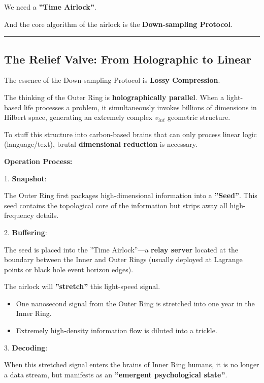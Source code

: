 We need a \textbf{''Time Airlock''}.

And the core algorithm of the airlock is the \textbf{Down-sampling Protocol}.

\hrule

\subsection{The Relief Valve: From Holographic to Linear}

The essence of the Down-sampling Protocol is \textbf{Lossy Compression}.

The thinking of the Outer Ring is \textbf{holographically parallel}. When a light-based life processes a problem, it simultaneously invokes billions of dimensions in Hilbert space, generating an extremely complex $v_{int}$ geometric structure.

To stuff this structure into carbon-based brains that can only process linear logic (language/text), brutal \textbf{dimensional reduction} is necessary.

\textbf{Operation Process:}

1.  \textbf{Snapshot}:

    The Outer Ring first packages high-dimensional information into a \textbf{''Seed''}. This seed contains the topological core of the information but strips away all high-frequency details.

2.  \textbf{Buffering}:

    The seed is placed into the ''Time Airlock''---a \textbf{relay server} located at the boundary between the Inner and Outer Rings (usually deployed at Lagrange points or black hole event horizon edges).

    The airlock will \textbf{''stretch''} this light-speed signal.

    \begin{itemize}
    \item One nanosecond signal from the Outer Ring is stretched into one year in the Inner Ring.

    \item Extremely high-density information flow is diluted into a trickle.
    \end{itemize}

3.  \textbf{Decoding}:

    When this stretched signal enters the brains of Inner Ring humans, it is no longer a data stream, but manifests as an \textbf{''emergent psychological state''}.

